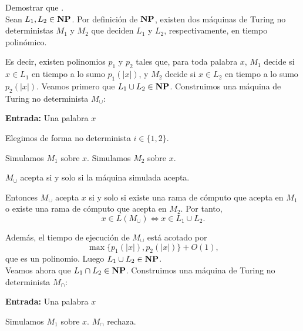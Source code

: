 \begin{ejercicio}
    Demostrar que \NP {}. \\

    Sean $L_1,L_2 \in \textbf{NP}$. Por definición de $\textbf{NP}$, existen dos máquinas de Turing no deterministas
    $M_1$ y $M_2$ que deciden $L_1$ y $L_2$, respectivamente, en tiempo polinómico.

    Es decir, existen polinomios $p_1$ y $p_2$ tales que, para toda palabra $x$,
    $M_1$ decide si $x \in L_1$ en tiempo a lo sumo $p_1(|x|)$, y $M_2$ decide si
    $x \in L_2$ en tiempo a lo sumo $p_2(|x|)$.
    Veamos primero que $L_1 \cup L_2 \in \textbf{NP}$. Construimos una máquina de Turing no determinista
    $M_{\cup}$:

    \begin{algorithm}
    \caption{MTND $M_{\cup}$}
    \begin{algorithmic}
        \State \textbf{Entrada:} Una palabra $x$

        \State Elegimos de forma no determinista $i \in \{1,2\}$.

            \State Simulamos $M_1$ sobre $x$.
        \Else
            \State Simulamos $M_2$ sobre $x$.
        \EndIf

        \State $M_{\cup}$ acepta si y solo si la máquina simulada acepta.
    \end{algorithmic}
    \end{algorithm}

    Entonces $M_{\cup}$ acepta $x$ si y solo si existe una rama de cómputo que acepta en $M_1$
    o existe una rama de cómputo que acepta en $M_2$. Por tanto,
    $$
    x \in L(M_{\cup}) \iff x \in L_1 \cup L_2.
    $$

    Además, el tiempo de ejecución de $M_{\cup}$ está acotado por
    $$
    \max\{p_1(|x|),p_2(|x|)\} + O(1),
    $$
    que es un polinomio. Luego $L_1 \cup L_2 \in \textbf{NP}$. \\

    Veamos ahora que $L_1 \cap L_2 \in \textbf{NP}$. Construimos una máquina de Turing no determinista
    $M_{\cap}$:

    \begin{algorithm}
    \caption{MTND $M_{\cap}$}
    \begin{algorithmic}
        \State \textbf{Entrada:} Una palabra $x$

        \State Simulamos $M_1$ sobre $x$.
            \State $M_{\cap}$ rechaza.
        \EndIf


\end{algorithmic}
\end{algorithm}
\end{ejercicio}
